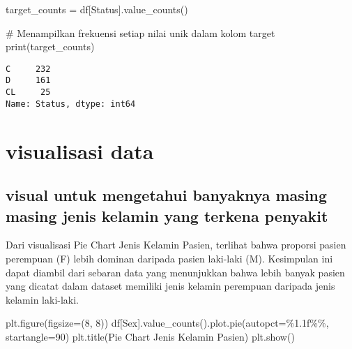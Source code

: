 \documentclass[
  letterpaper,
]{krantz}
\makeatletter
\newenvironment{Shaded}{\begin{snugshade}}{\end{snugshade}}
\newcommand{\BuiltInTok}[1]{\textcolor[rgb]{0.00,0.23,0.31}{#1}}
\newcommand{\CommentTok}[1]{\textcolor[rgb]{0.37,0.37,0.37}{#1}}
\newcommand{\DecValTok}[1]{\textcolor[rgb]{0.68,0.00,0.00}{#1}}
\newcommand{\NormalTok}[1]{\textcolor[rgb]{0.00,0.23,0.31}{#1}}
\newcommand{\OperatorTok}[1]{\textcolor[rgb]{0.37,0.37,0.37}{#1}}
\newcommand{\SpecialCharTok}[1]{\textcolor[rgb]{0.37,0.37,0.37}{#1}}
\newcommand{\StringTok}[1]{\textcolor[rgb]{0.13,0.47,0.30}{#1}}
\newenvironment{kframe}{%
\medskip{}
\setlength{\fboxsep}{.8em}
 \def\at@end@of@kframe{}%
 \ifinner\ifhmode%
  \def\at@end@of@kframe{\end{minipage}}%
  \begin{minipage}{\columnwidth}%
 \fi\fi%
 \def\FrameCommand##1{\hskip\@totalleftmargin \hskip-\fboxsep
 \colorbox{shadecolor}{##1}\hskip-\fboxsep
     \hskip-\linewidth \hskip-\@totalleftmargin \hskip\columnwidth}%
 \MakeFramed {\advance\hsize-\width
   \@totalleftmargin\z@ \linewidth\hsize
   \@setminipage}}%
 {\par\unskip\endMakeFramed%
 \at@end@of@kframe}
\renewenvironment{Shaded}{\begin{kframe}}{\end{kframe}}
\makeatother
\begin{document}
\begin{Shaded}
\begin{Highlighting}[]
\NormalTok{target\_counts }\OperatorTok{=}\NormalTok{ df[}\StringTok{\textquotesingle{}Status\textquotesingle{}}\NormalTok{].value\_counts()}

\CommentTok{\# Menampilkan frekuensi setiap nilai unik dalam kolom target}
\BuiltInTok{print}\NormalTok{(target\_counts)}
\end{Highlighting}
\end{Shaded}

\begin{verbatim}
C     232
D     161
CL     25
Name: Status, dtype: int64
\end{verbatim}

\hypertarget{visualisasi-data-1}{%
\section{visualisasi data}\label{visualisasi-data-1}}

\hypertarget{visual-untuk-mengetahui-banyaknya-masing-masing-jenis-kelamin-yang-terkena-penyakit-1}{%
\subsection{visual untuk mengetahui banyaknya masing masing jenis
kelamin yang terkena
penyakit}\label{visual-untuk-mengetahui-banyaknya-masing-masing-jenis-kelamin-yang-terkena-penyakit-1}}

Dari visualisasi Pie Chart Jenis Kelamin Pasien, terlihat bahwa proporsi
pasien perempuan (F) lebih dominan daripada pasien laki-laki (M).
Kesimpulan ini dapat diambil dari sebaran data yang menunjukkan bahwa
lebih banyak pasien yang dicatat dalam dataset memiliki jenis kelamin
perempuan daripada jenis kelamin laki-laki.

\begin{Shaded}
\begin{Highlighting}[]
\NormalTok{plt.figure(figsize}\OperatorTok{=}\NormalTok{(}\DecValTok{8}\NormalTok{, }\DecValTok{8}\NormalTok{))}
\NormalTok{df[}\StringTok{\textquotesingle{}Sex\textquotesingle{}}\NormalTok{].value\_counts().plot.pie(autopct}\OperatorTok{=}\StringTok{\textquotesingle{}}\SpecialCharTok{\%1.1f\%\%}\StringTok{\textquotesingle{}}\NormalTok{, startangle}\OperatorTok{=}\DecValTok{90}\NormalTok{)}
\NormalTok{plt.title(}\StringTok{\textquotesingle{}Pie Chart Jenis Kelamin Pasien\textquotesingle{}}\NormalTok{)}
\NormalTok{plt.show()}
\end{Highlighting}
\end{Shaded}
\end{document}
